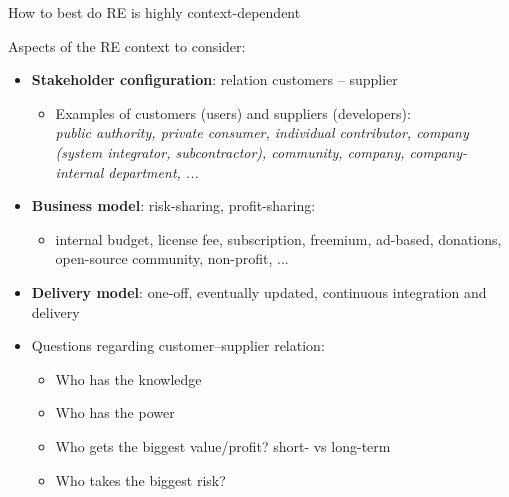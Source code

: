 \begin{Slide}{How to best do RE is highly context-dependent}

Aspects of the RE context to consider: 
\begin{itemize}
\item \textbf{Stakeholder configuration}: relation customers -- supplier  
\begin{itemize}
\item Examples of customers (users) and suppliers (developers): \\
    \textit{public authority, private consumer, individual contributor, company (system integrator, subcontractor), community, company, company-internal department, ...}
\end{itemize}
\item \textbf{Business model}: risk-sharing, profit-sharing: \\
\begin{itemize}
\item internal budget, license fee, subscription, freemium, ad-based, donations, open-source community, non-profit, ... 
\end{itemize}
\item \textbf{Delivery model}: one-off, eventually updated, continuous integration and delivery

\item Questions regarding customer--supplier relation:
\begin{itemize}
\item Who has the knowledge
\item Who has the power
\item Who gets the biggest value/profit? short- vs long-term
\item Who takes the biggest risk?


\end{itemize}
\end{itemize}
\end{Slide}